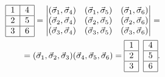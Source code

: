 \documentclass[]{article}
\renewcommand{\[}{\begin{equation}}
\renewcommand{\]}{\end{equation}}
\begin{document}
\begin{align}
\begin{tabular}{ |l|l| }
\hline
1 & 4 \\ \hline
2 & 5\\ \hline
3 & 6\\
\hline
\end{tabular}
=
\begin{vmatrix}
(\vec\sigma_1,\vec\sigma_4) & (\vec\sigma_1,\vec\sigma_5) & (\vec\sigma_1,\vec\sigma_6) \\
(\vec\sigma_2,\vec\sigma_4) & (\vec\sigma_2,\vec\sigma_5) & (\vec\sigma_2,\vec\sigma_6) \\
(\vec\sigma_3,\vec\sigma_4) & (\vec\sigma_3,\vec\sigma_5) & (\vec\sigma_3,\vec\sigma_6) \\
\end{vmatrix}
=\nonumber\\
=
(\vec \sigma_1, \vec \sigma_2, \vec \sigma_3)
(\vec \sigma_4, \vec \sigma_5, \vec \sigma_6)
=
\begin{tabular}{ |l| }
\hline
1  \\ \hline
2 \\ \hline
3 \\
\hline
\end{tabular}
\;\;
\begin{tabular}{ |l| }
\hline
 4 \\ \hline
 5\\ \hline
 6\\
\hline
\end{tabular}
.\nonumber
\end{align}
\end{document}
